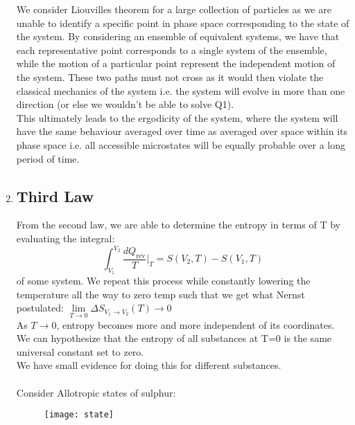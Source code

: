 \documentclass[12pt,a4paper]{article}
\begin{document}
\begin{enumerate}
    We consider Liouvilles theorem for a large collection of particles as we are unable to identify a specific point in phase space corresponding to the state of the system. By considering an ensemble of equivalent systems, we have that each representative point corresponds to a single system of the ensemble, while the motion of a particular point represent the independent motion of the system. These two paths must not cross as it would then violate the classical mechanics of the system i.e. the system will evolve in more than one direction (or else we wouldn't be able to solve Q1).\\
    This ultimately leads to the ergodicity of the system, where the system will have the same behaviour averaged over time as averaged over space within its phase space i.e. all accessible microstates will be equally probable over a long period of time.
    \setcounter{enumi}{4}
    \newpage
    \item \subsection*{Third Law}
    From the second law, we are able to determine the entropy in terms of T by evaluating the integral:
    \[\int_{V_1}^{V_2}\frac{dQ_{\text{rev}}}{T}\bigg|_T = S(V_2,T) - S(V_1,T)\]
    of some system. We repeat this process while constantly lowering the temperature all the way to zero temp such that we get what Nernst postulated: $\lim\limits_{T\rightarrow 0}\Delta S_{V_1\rightarrow V_2}(T) \rightarrow 0$\\
    As $T\rightarrow0$, entropy becomes more and more independent of its coordinates. We can hypothesize that the entropy of all substances at T=0 is the same universal constant set to zero.\\
    We have small evidence for doing this for different substances.\\
    \\
    Consider Allotropic states of sulphur:
    \vspace{-4mm}
    \begin{figure}[!hbt]
    	\begin{center}
    		\texttt{[image: state]}\par
    	\end{center}
    \end{figure}
    \vspace{-5mm}
    

\end{enumerate}
\end{document}
